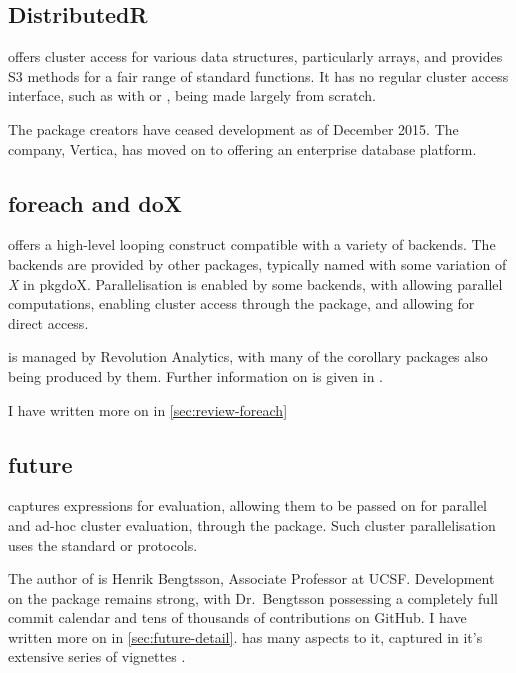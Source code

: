 \subsection{DistributedR}\label{subsec:distributedr}

 offers cluster access for various \R{} data structures,
particularly arrays, and provides S3 methods for a fair range of
standard functions. It has no regular cluster access interface, such as
with  or , being made largely from scratch.

The package creators have ceased development as of December 2015. The
company, Vertica, has moved on to offering an enterprise database
platform\cite{vertica:_distr}.

\subsection{foreach and doX}\label{subsec:foreach-doc}

 offers a high-level looping construct compatible with a variety
of backends\cite{microsoft20}. The backends are provided by other
packages, typically named with some variation of \emph{X} in pkg{doX}.
Parallelisation is enabled by some backends, with  allowing
parallel computations\cite{corporation19},  enabling cluster
access through the  package\cite{dosnow19}, and  allowing for
direct  access\cite{weston17}.

 is managed by Revolution Analytics, with many of the 
corollary packages also being produced by them. Further information on
 is given in \cite{weston19:_using}.

I have written more on  in \cref{sec:review-foreach}

\subsection{future}\label{subsec:future-furrr}

 captures \R{} expressions for evaluation, allowing them to be passed
on for parallel and ad-hoc cluster evaluation, through the 
package\cite{bengtsson20}. Such cluster parallelisation uses the standard  or
 protocols.

The author of  is Henrik Bengtsson, Associate Professor at UCSF.
Development on the package remains strong, with Dr.~Bengtsson possessing
a completely full commit calendar and tens of thousands of contributions on GitHub. I
have written more on  in \cref{sec:future-detail}.  has many aspects to it, captured in it's
extensive series of vignettes\cites{bengtsson20:future-r,bengtsson20:future-r2}
\cites{bengtsson20:future-r3,bengtsson20:future-r4,bengtsson20:future-r5,bengtsson20:future-r6}.

